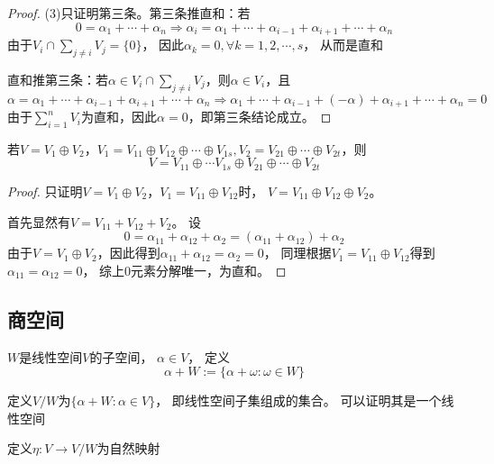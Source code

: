\begin{proof}
  (3)只证明第三条。第三条推直和：若
  \begin{equation*}
    0 = \alpha_1 + \cdots + \alpha_n \Rightarrow \alpha_i = \alpha_1 + \cdots + \alpha_{i-1}+\alpha_{i+1}+\cdots + \alpha_n
  \end{equation*}
  由于$V_i \cap \sum\limits_{j \neq i} V_j = \{0\}$，
  因此$\alpha_k = 0, \forall k = 1,2,\cdots,s$，
  从而是直和

  直和推第三条：若$\alpha \in V_i \cap \sum\limits_{j \neq i} V_j$，则$\alpha \in V_i$，且
  \begin{equation*}
    \alpha = \alpha_1 + \cdots + \alpha_{i-1} + \alpha_{i+1}+\cdots +\alpha_n \Rightarrow
    \alpha_1 + \cdots + \alpha_{i-1} + (-\alpha) + \alpha_{i+1}+\cdots +\alpha_{n }= 0
  \end{equation*}
  由于$\sum\limits_{i = 1}^n V_i$为直和，因此$\alpha = 0$，即第三条结论成立。
\end{proof}

\begin{theorem}[直和合并定理]
  若$V = V_1 \oplus V_2$，$V_1 = V_{11} \oplus V_{12} \oplus \cdots \oplus V_{1s}, V_2 = V_{21} \oplus \cdots \oplus V_{2t}$，则
  \begin{equation*}
    V = V_{11}\oplus \cdots V_{1s} \oplus V_{21} \oplus \cdots \oplus V_{2t}
  \end{equation*}
\end{theorem}

\begin{proof}
  只证明$V = V_1 \oplus V_2$，$V_1 = V_{11} \oplus V_{12}$时，
  $V = V_{11} \oplus V_{12} \oplus V_2$。

  首先显然有$V = V_{11} + V_{12} + V_2$。
  设
  \begin{equation*}
    0 = \alpha_{11} + \alpha_{12} + \alpha_2 = (\alpha_{11} + \alpha_{12}) + \alpha_2
  \end{equation*}
  由于$V = V_1 \oplus V_2$，因此得到$\alpha_{11} + \alpha_{12} = \alpha _2 = 0$，
  同理根据$V_1 = V_{11}\oplus V_{12}$得到$\alpha_{11} = \alpha_{12} = 0$，
  综上$0$元素分解唯一，为直和。
\end{proof}



\subsection{商空间}

\begin{definition}[商空间的元素]
  $W$是线性空间$V$的子空间，
  $\alpha \in V$，
  定义
  \begin{equation*}
    \alpha + W := \{\alpha + \omega: \omega \in W\}
  \end{equation*}
\end{definition}

\begin{definition}[商空间]
  定义$V/W$为$\{\alpha + W: \alpha \in V\}$，
  即线性空间子集组成的集合。
  可以证明其是一个线性空间
\end{definition}

\begin{definition}[自然映射]
  定义$\eta : V \rightarrow V/W$为自然映射
\end{definition}






